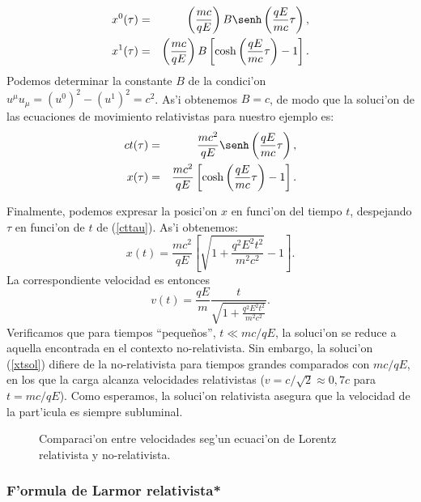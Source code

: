 \begin{eqnarray}
x^0(\tau)&=&\left(\frac{mc}{qE}\right)B\senh\left(\frac{qE}{mc}\tau\right) ,\\
x^1(\tau)&=&\left(\frac{mc}{qE}\right)B\left[\cosh\left(
\frac{qE}{mc}\tau\right)-1\right] .
\end{eqnarray}
Podemos determinar la constante $B$ de la condici'on $u^\mu
u_\mu=(u^0)^2-(u^1)^2=c^2$. As'i obtenemos $B=c$, de modo que la
soluci'on de las ecuaciones de movimiento relativistas para nuestro ejemplo es:
\begin{eqnarray}
ct(\tau)&=&\frac{mc^2}{qE}\senh\left( \frac{qE}{mc}\tau\right), \label{cttau}\\
x(\tau)&=&\frac{mc^2}{qE}\left[ \cosh\left( \frac{qE}{mc}\tau\right)-1\right] .
\end{eqnarray}

Finalmente, podemos expresar la posici'on $x$ en funci'on del tiempo $t$,
despejando $\tau$ en funci'on de $t$ de (\ref{cttau}). As'i obtenemos:
\begin{equation}
x(t) = \frac{mc^2}{qE} \left[ \sqrt{1 + \frac{q^2 E^2 t^2}{m^2c^2}} - 1 \right].
\label{xtsol}
\end{equation}
La correspondiente velocidad es entonces
\begin{equation}
v(t) = \frac{qE}{m}\frac{t}{\sqrt{1 + \frac{q^2 E^2 t^2}{m^2c^2}}}.
\end{equation}
Verificamos que para tiempos ``peque\~nos'', $t\ll {mc}/{qE}$, la soluci'on se
reduce a aquella encontrada en el contexto no-relativista. Sin embargo, la
soluci'on (\ref{xtsol}) difiere de la no-relativista para tiempos grandes
comparados con ${mc}/{qE}$, en los que la carga alcanza velocidades
relativistas ($v={c}/{\sqrt{2}}\approx 0,7c$ para $t={mc}/{qE}$). Como esperamos, la soluci'on relativista asegura que la velocidad de la part'icula es siempre subluminal.

\begin{center}
\begin{figure}[H]
\centerline{}
\caption{Comparaci'on entre velocidades seg'un ecuaci'on de Lorentz relativista y no-relativista.}
\label{fig:relnorel}
\end{figure}
\end{center}


\subsubsection{F'ormula de Larmor relativista*}


